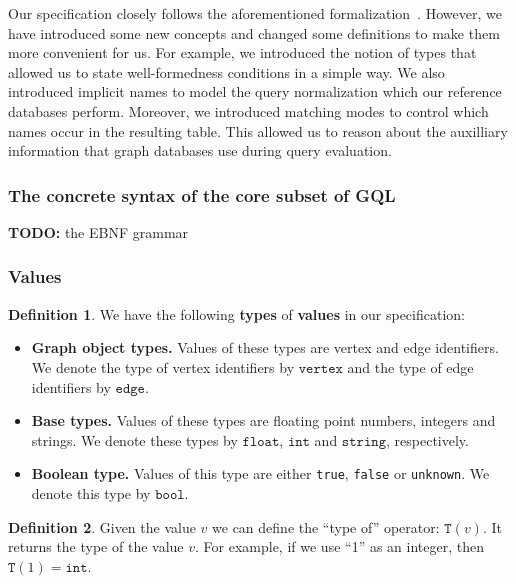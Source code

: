 \documentclass[14pt]{constructor-thesis}
\theoremstyle{definition}
\newtheorem{definition}{Definition}
\newcommand{\todo}[1]{
  \begin{tcolorbox}[colframe=red!75!black,colback=red!5!white,arc=0pt,fonttitle=\bfseries]
  \textbf{TODO:} #1
  \end{tcolorbox}
}
\begin{document}
Our specification closely follows the aforementioned formalization~\cite{GQL-formalized-on-paper}. However, we have introduced some new concepts and changed some definitions to make them more convenient for us. For example, we introduced the notion of types that allowed us to state well-formedness conditions in a simple way. We also introduced implicit names to model the query normalization which our reference databases perform. Moreover, we introduced matching modes to control which names occur in the resulting table. This allowed us to reason about the auxilliary information that graph databases use during query evaluation.

\subsubsection{The concrete syntax of the core subset of GQL}
\label{sec:GQL-syntax}

\todo{the EBNF grammar}

\subsubsection{Values}
\label{sec:GQL-values}

\begin{definition}
  We have the following \textbf{types} of \textbf{values} in our specification:
  \begin{itemize}
    \item \textbf{Graph object types.} Values of these types are vertex and edge identifiers. We denote the type of vertex identifiers by $\mathtt{vertex}$ and the type of edge identifiers by $\mathtt{edge}$.
    \item \textbf{Base types.} Values of these types are floating point numbers, integers and strings. We denote these types by $\mathtt{float}$, $\mathtt{int}$ and $\mathtt{string}$, respectively.
    \item \textbf{Boolean type.} Values of this type are either \texttt{true}, \texttt{false} or \texttt{unknown}. We denote this type by $\mathtt{bool}$.
  \end{itemize}
\end{definition}

\begin{definition}
  Given the value $v$ we can define the ``type of'' operator: $\mathtt{T}(v)$. It returns the type of the value $v$. For example, if we use ``1'' as an integer, then $\mathtt{T}(1) = \mathtt{int}$.
\end{definition}
\end{document}
